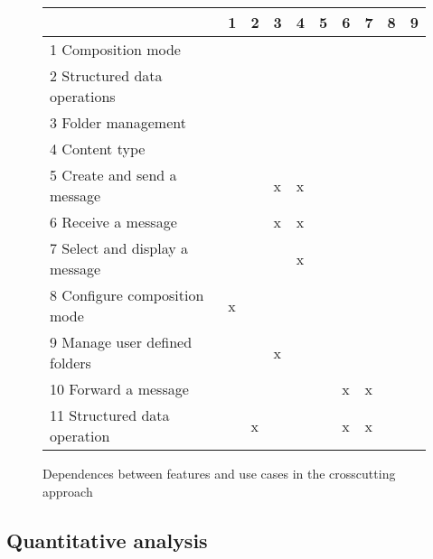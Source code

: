\documentclass{acm_proc_article-sp}
\begin{document}
\begin{figure}[h]
\centering
\begin{scriptsize}
\begin{tabular}{llllllllll} \hline
								& 1 	& 2 	& 3 & 4 	& 5 	& 6 	& 7 	& 8 	& 9 	 \\ \hline
1 Composition mode 				& 	& 	& 	& 	& 	& 	& 	& 	& 		\\
2 Structured data operations	 		& 	& 	& 	& 	& 	& 	& 	& 	& 	\\
3 Folder management 				& 	& 	& 	& 	& 	& 	& 	& 	& 	\\
4 Content type						& 	& 	& 	& 	& 	& 	& 	& 	& 	\\ \hline
5 Create and send a message 			& 	& 	& x	& x	& 	& 	& 	& 	& 	\\
6 Receive a message 				& 	& 	& x	& x	& 	&	& 	& 	& 	\\
7 Select and display a message 		& 	& 	& 	& x	& 	& 	& 	& 	& 	\\
8 Configure composition mode 		& x	& 	& 	& 	& 	& 	& 	& 	& 	\\
9 Manage user defined folders 		& 	& 	& x	& 	& 	& 	& 	& 	& 	\\ 
10 Forward a message		 		& 	& 	& 	& 	& 	& x	& x	& 	& 	\\ 
11 Structured data operation	 		& 	& x	& 	& 	& 	& x	& x	& 	& 	\\ \hline 
\end{tabular}
\end{scriptsize}
\caption{Dependences between features and use cases in the crosscutting approach}
\label{dsm:ll-cc}
\end{figure}   

\subsection{Quantitative analysis}
\label{quantitative-analysis}
\end{document}
